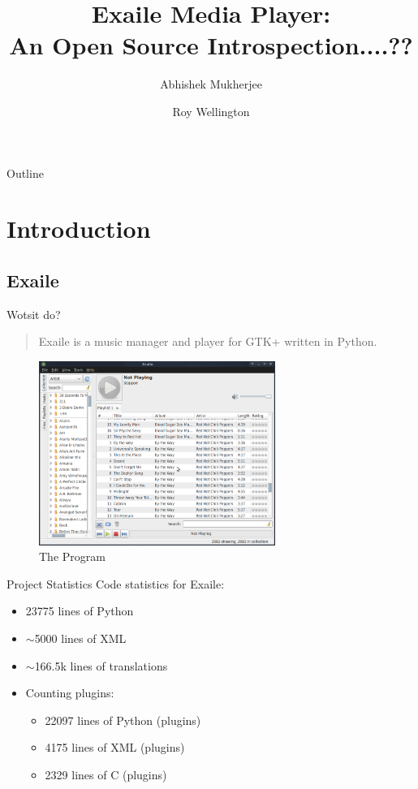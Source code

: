 \documentclass{beamer}
\title
{%
  Exaile Media Player:\\
  An Open Source Introspection....?? %
}
\author
{
  Abhishek Mukherjee \and
  Roy Wellington
}
\begin{document}
\begin{frame}
  \titlepage
\end{frame}

\begin{frame}{Outline}
  \tableofcontents
\end{frame}


\section{Introduction}

\subsection{Exaile}

\begin{frame}{Wotsit do?}
  \begin{quote}
    Exaile is a music manager and player for GTK+ written in Python.
  \end{quote}
  \begin{figure}
    \includegraphics[height=60mm]{images/exaile}
    \caption{The Program}
  \end{figure}
\end{frame}

\begin{frame}{Project Statistics}
  Code statistics for Exaile:
  \begin{itemize}
    \item 23775 lines of Python
    \item $\sim$5000 lines of XML
    \item $\sim$166.5k lines of translations
	\item Counting plugins:
	\begin{itemize}
      \item 22097 lines of Python (plugins)
      \item 4175 lines of XML (plugins)
      \item 2329 lines of C (plugins)
	\end{itemize}
  \end{itemize}
\end{frame}
\end{document}
